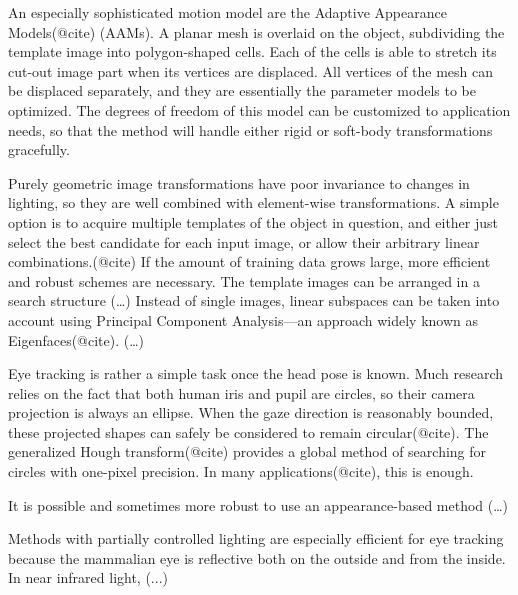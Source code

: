 An especially sophisticated motion model are the Adaptive Appearance Models(@cite) (AAMs).
A planar mesh is overlaid on the object, subdividing the template image into polygon-shaped cells.
Each of the cells is able to stretch its cut-out image part when its vertices are displaced.
All vertices of the mesh can be displaced separately, and they are essentially the parameter models to be optimized.
The degrees of freedom of this model can be customized to application needs, so that the method will handle either rigid or soft-body transformations gracefully.

Purely geometric image transformations have poor invariance to changes in lighting, so they are well combined with element-wise transformations.
A simple option is to acquire multiple templates of the object in question, and either just select the best candidate for each input image, or allow their arbitrary linear combinations.(@cite)
If the amount of training data grows large, more efficient and robust schemes are necessary.
The template images can be arranged in a search structure (\dots)
Instead of single images, linear subspaces can be taken into account using Principal Component Analysis---an approach widely known as Eigenfaces(@cite).
(\dots)

Eye tracking is rather a simple task once the head pose is known.
Much research relies on the fact that both human iris and pupil are circles, so their camera projection is always an ellipse.
When the gaze direction is reasonably bounded, these projected shapes can safely be considered to remain circular(@cite).
The generalized Hough transform(@cite) provides a global method of searching for circles with one-pixel precision.
In many applications(@cite), this is enough.

It is possible and sometimes more robust to use an appearance-based method (\dots)

Methods with partially controlled lighting are especially efficient for eye tracking because the mammalian eye is reflective both on the outside and from the inside.
In near infrared light, (...)

